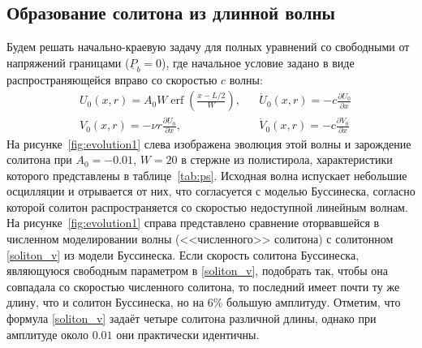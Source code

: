 \documentclass[12pt, a4paper]{report}
\DeclareMathOperator{\erf}{erf}
\newcommand{\lb}{\left (}
\newcommand{\rb}{\right )}
\newcommand{\vect}[1]{\underline{#1}}
\newcommand{\pdiff}[2]{\frac{\partial #1}{\partial #2}}
\begin{document}
\subsection{Образование солитона из длинной волны}
Будем решать начально-краевую задачу для полных уравнений со свободными от напряжений границами ($\vect{P}_b=0$), где начальное условие задано в виде распространяющейся вправо со скоростью $c$ волны:
\begin{align}
\label{3_ic_u}
& U_0 (x, r) = A_0 W \erf\lb \frac{x - L/2}{W}\rb,&  &\dot{U}_0 (x, r) = -c \pdiff{U_0}{x}\\
\label{3_ic_v}
& V_0(x, r) = -\nu r \pdiff{U_0}{x},& &\dot{V}_0 (x, r) = -c \pdiff{V_0}{x}
\end{align}
На рисунке~\ref{fig:evolution1} слева изображена эволюция этой волны и зарождение солитона при $A_0=-0.01$, $W=20$ в стержне из полистирола, характеристики которого представлены в таблице~\ref{tab:ps}. Исходная волна испускает небольшие осцилляции и отрывается от них, что согласуется с моделью Буссинеска, согласно которой солитон распространяется со скоростью недоступной линейным волнам. На рисунке~\ref{fig:evolution1} справа представлено сравнение оторвавшейся в численном моделировании волны (<<численного>> солитона) с солитонном \eqref{soliton_v} из модели Буссинеска.
Если скорость солитона Буссинеска, являющуюся свободным параметром в \eqref{soliton_v}, подобрать так, чтобы она совпадала со скоростью численного солитона, то последний имеет почти ту же длину, что и солитон Буссинеска, но на 6\% большую амплитуду.
Отметим, что формула \eqref{soliton_v} задаёт четыре солитона различной длины, однако при амплитуде около $0.01$ они практически идентичны.
\end{document}
